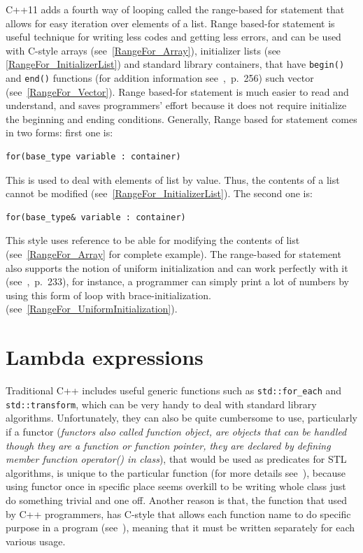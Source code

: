 \documentclass[11pt]{report}
\begin{document}
C++11 adds a fourth way of looping called the range-based for statement that allows for easy iteration over elements of a list. Range based-for statement is useful technique for writing less codes and getting less errors, and can be used with C-style arrays (see~\ref{RangeFor_Array}), initializer lists (see \ref{RangeFor_InitializerList}) and standard library containers, that have \texttt{begin()} and \texttt{end()} functions (for addition information see~\cite{Overland:2011:CWF},~p.~256) such vector (see~\ref{RangeFor_Vector}). Range based-for statement is much easier to read and understand, and saves programmers' effort because it does not require initialize the beginning and ending conditions. Generally, Range based for statement comes in two forms: first one is:
\begin{lstlisting}
for(base_type variable : container)
\end{lstlisting} 
This is used to deal with elements of list by value. Thus, the contents of a list cannot be modified (see~\ref{RangeFor_InitializerList}). The second one is:
\begin{lstlisting}
for(base_type& variable : container)
\end{lstlisting}
This style uses reference to be able for modifying the contents of list (see~\ref{RangeFor_Array} for complete example). The range-based for statement also supports the notion of uniform initialization and can work perfectly with it (see~\cite{Prata:2012:Cpp},~p.~233), for instance, a programmer can simply print a lot of numbers by using this form of loop with brace-initialization. (see~\ref{RangeFor_UniformInitialization}).

\section{Lambda expressions}
\label{section: Lambda Expressions}
Traditional C++ includes useful generic functions such as \texttt{std::for\_each} and \texttt{std::transform}, which can be very handy to deal with standard library algorithms. Unfortunately, they can also be quite cumbersome to use, particularly if a functor (\emph{functors also called function object, are objects that can be handled though they are a function or function pointer, they are declared by defining member function operator() in class}), that would be used as predicates for STL algorithms, is unique to the particular function (for more details see~\cite{Allain:2011:FutureCpp}), because using functor once in specific place seems overkill to be writing whole class just do something trivial and one off. Another reason is that, the function that used by C++ programmers, has C-style that allows each function name to do specific purpose in a program (see~\cite{Cppreference:2012:Cpp11}), meaning that it must be written separately for each various usage.
\end{document}
